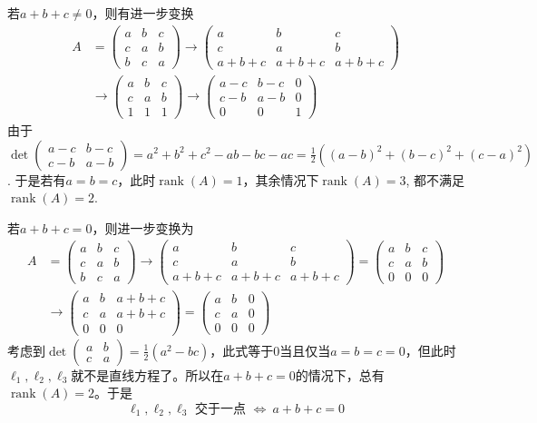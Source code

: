 若$a+b+c\neq 0$，则有进一步变换
\begin{align*}
A & = \begin{pmatrix} a & b & c \\ c & a & b \\ b & c & a \end{pmatrix} \to \begin{pmatrix} a & b & c \\ c & a & b \\ a+b+c & a+b+c & a+b+c \end{pmatrix} \\
& \to \begin{pmatrix} a & b & c \\ c & a & b \\ 1 & 1 & 1 \end{pmatrix} \to \begin{pmatrix} a-c & b-c & 0 \\ c-b & a-b & 0 \\ 0 & 0 & 1 \end{pmatrix}
\end{align*}
由于$\det\begin{pmatrix} a-c & b-c \\ c-b & a-b \end{pmatrix} = a^2+b^2+c^2-ab-bc-ac = \frac12\left( (a-b)^2 + (b-c)^2 + (c-a)^2 \right)$. 于是若有$a=b=c$，此时$\operatorname{rank}(A) = 1$，其余情况下$\operatorname{rank}(A) = 3$, 都不满足$\operatorname{rank}(A) = 2$.

若$a+b+c=0$，则进一步变换为
\begin{align*}
A & = \begin{pmatrix} a & b & c \\ c & a & b \\ b & c & a \end{pmatrix} \to \begin{pmatrix} a & b & c \\ c & a & b \\ a+b+c & a+b+c & a+b+c \end{pmatrix} = \begin{pmatrix} a & b & c \\ c & a & b \\ 0 & 0 & 0 \end{pmatrix}\\
& \to \begin{pmatrix} a & b & a+b+c \\ c & a & a+b+c \\ 0 & 0 & 0 \end{pmatrix} = \begin{pmatrix} a & b & 0 \\ c & a & 0 \\ 0 & 0 & 0 \end{pmatrix}
\end{align*}
考虑到$\det\begin{pmatrix} a & b \\ c & a \end{pmatrix} = \frac12\left( a^2-bc\right)$，此式等于$0$当且仅当$a=b=c=0$，但此时$\ell_1,\ell_2,\ell_3$就不是直线方程了。所以在$a+b+c=0$的情况下，总有$\operatorname{rank}(A) = 2$。于是
$$\ell_1,\ell_2,\ell_3 \text{ 交于一点 } \Longleftrightarrow \ a+b+c=0$$

